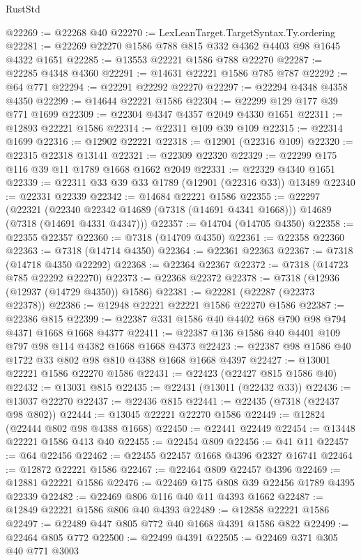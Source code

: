 \begin{lexlean}{RustStd}
\begin{coremodule}
@22269 := @22268 @40
@22270 := LexLeanTarget.TargetSyntax.Ty.ordering
@22281 := @22269 @22270 @1586 @788 @815 @332 @4362 @4403 @98 @1645 @4322 @1651
@22285 := @13553 @22221 @1586 @788 @22270
@22287 := @22285 @4348 @4360
@22291 := @14631 @22221 @1586 @785 @787
@22292 := @64 @771
@22294 := @22291 @22292 @22270
@22297 := @22294 @4348 @4358 @4350
@22299 := @14644 @22221 @1586
@22304 := @22299 @129 @177 @39 @771 @1699
@22309 := @22304 @4347 @4357 @2049 @4330 @1651
@22311 := @12893 @22221 @1586
@22314 := @22311 @109 @39 @109
@22315 := @22314 @1699
@22316 := @12902 @22221
@22318 := @12901 (@22316 @109)
@22320 := @22315 @22318 @13141
@22321 := @22309 @22320
@22329 := @22299 @175 @116 @39 @11 @1789 @1668 @1662 @2049
@22331 := @22329 @4340 @1651
@22339 := @22311 @33 @39 @33 @1789 (@12901 (@22316 @33)) @13489
@22340 := @22331 @22339
@22342 := @14684 @22221 @1586
@22355 := @22297
    (@22321 (@22340 @22342 @14689 (@7318 (@14691 @4341 @1668))) @14689 (@7318 (@14691 @4331 @4347)))
@22357 := @14704 (@14705 @4350)
@22358 := @22355 @22357
@22360 := @7318 (@14709 @4350)
@22361 := @22358 @22360
@22363 := @7318 (@14714 @4350)
@22364 := @22361 @22363
@22367 := @7318 (@14718 @4350 @22292)
@22368 := @22364 @22367
@22372 := @7318 (@14723 @785 @22292 @22270)
@22373 := @22368 @22372
@22378 := @7318 (@12936 (@12937 (@14729 @4350)) @1586)
@22381 := @22281 (@22287 (@22373 @22378))
@22386 := @12948 @22221 @22221 @1586 @22270 @1586
@22387 := @22386 @815
@22399 := @22387 @331 @1586 @40 @4402 @68 @790 @98 @794 @4371 @1668 @1668 @4377
@22411 := @22387 @136 @1586 @40 @4401 @109 @797 @98 @114 @4382 @1668 @1668 @4373
@22423 := @22387 @98 @1586 @40 @1722 @33 @802 @98 @810 @4388 @1668 @1668 @4397
@22427 := @13001 @22221 @1586 @22270 @1586
@22431 := @22423 (@22427 @815 @1586 @40)
@22432 := @13031 @815
@22435 := @22431 (@13011 (@22432 @33))
@22436 := @13037 @22270
@22437 := @22436 @815
@22441 := @22435 (@7318 (@22437 @98 @802))
@22444 := @13045 @22221 @22270 @1586
@22449 := @12824 (@22444 @802 @98 @4388 @1668)
@22450 := @22441 @22449
@22454 := @13448 @22221 @1586 @413 @40
@22455 := @22454 @809
@22456 := @41 @11
@22457 := @64 @22456
@22462 := @22455 @22457 @1668 @4396 @2327 @16741
@22464 := @12872 @22221 @1586
@22467 := @22464 @809 @22457 @4396
@22469 := @12881 @22221 @1586
@22476 := @22469 @175 @808 @39 @22456 @1789 @4395 @22339
@22482 := @22469 @806 @116 @40 @11 @4393 @1662
@22487 := @12849 @22221 @1586 @806 @40 @4393
@22489 := @12858 @22221 @1586
@22497 := @22489 @447 @805 @772 @40 @1668 @4391 @1586 @822
@22499 := @22464 @805 @772
@22500 := @22499 @4391
@22505 := @22469 @371 @305 @40 @771 @3003

\end{coremodule}
\end{lexlean}
